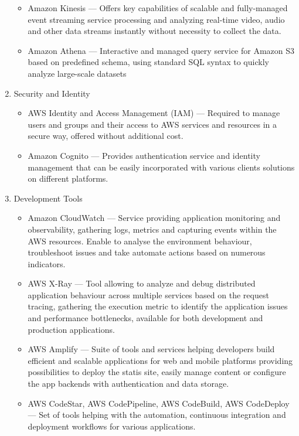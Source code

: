 \begin{enumerate}
   \begin{itemize}
       \item Amazon Kinesis --- Offers key capabilities of scalable and fully-managed event streaming service processing and analyzing real-time video, audio and other data streams instantly without necessity to collect the data.
       \item Amazon Athena --- Interactive and managed query service for Amazon S3 based on predefined schema, using standard SQL syntax to quickly analyze large-scale datasets
   \end{itemize}
   \item Security and Identity
   \begin{itemize}
       \item AWS Identity and Access Management (IAM) --- Required to manage users and groups and their access to AWS services and resources in a secure way, offered without additional cost.
       \item Amazon Cognito --- Provides authentication service and identity management that can be easily incorporated with various clients solutions on different platforms.
   \end{itemize}
   \item Development Tools
   \begin{itemize}
       \item Amazon CloudWatch --- Service providing application monitoring and observability, gathering logs, metrics and capturing events within the AWS resources. Enable to analyse the environment behaviour, troubleshoot issues and take automate actions based on numerous indicators.
       \item AWS X-Ray --- Tool allowing to analyze and debug distributed application behaviour across multiple services based on the request tracing, gathering the execution metric to identify the application issues and performance bottlenecks, available for both development and production applications.
       \item AWS Amplify --- Suite of tools and services helping developers build efficient and scalable applications for web and mobile platforms providing possibilities to deploy the statis site, easily manage content or configure the app backends with authentication and data storage.
       \item AWS CodeStar, AWS CodePipeline, AWS CodeBuild, AWS CodeDeploy --- Set of tools helping with the automation, continuous integration and deployment workflows for various applications.
   \end{itemize}
\end{enumerate}

